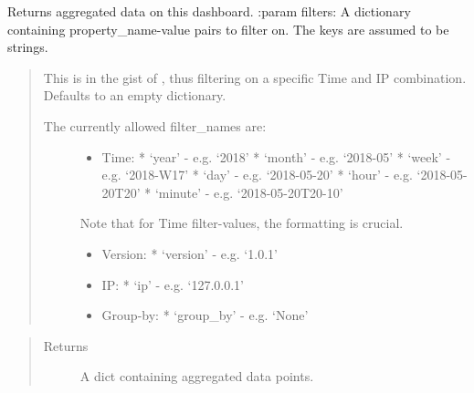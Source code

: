\documentclass[letterpaper,10pt,english]{sphinxmanual}
\begin{document}
\begin{fulllineitems}
\begin{fulllineitems}
\begin{quote}
\begin{description}
\end{description}\end{quote}

\end{fulllineitems}


\begin{fulllineitems}
\label{\detokenize{pydash_app.dashboard.entity:pydash_app.dashboard.entity.Dashboard.aggregated_data}}
Returns aggregated data on this dashboard.
:param filters: A dictionary containing property\_name-value pairs to filter on. The keys are assumed to be strings.
\begin{quote}

This is in the gist of , thus filtering on a specific Time and IP combination.
Defaults to an empty dictionary.
\begin{description}
\item[{The currently allowed filter\_names are:}] \leavevmode\begin{itemize}
\item {} 
Time:
* ‘year’   - e.g. ‘2018’
* ‘month’  - e.g. ‘2018-05’
* ‘week’   - e.g. ‘2018-W17’
* ‘day’    - e.g. ‘2018-05-20’
* ‘hour’   - e.g. ‘2018-05-20T20’
* ‘minute’ - e.g. ‘2018-05-20T20-10’

\end{itemize}

Note that for Time filter-values, the formatting is crucial.
\begin{itemize}
\item {} 
Version:
* ‘version’ - e.g. ‘1.0.1’

\item {} 
IP:
* ‘ip’ - e.g. ‘127.0.0.1’

\item {} 
Group-by:
* ‘group\_by’ - e.g. ‘None’

\end{itemize}

\end{description}
\end{quote}
\begin{quote}\begin{description}
\item[{Returns}] \leavevmode
A dict containing aggregated data points.


\end{description}
\end{quote}
\end{fulllineitems}
\end{fulllineitems}
\end{document}
